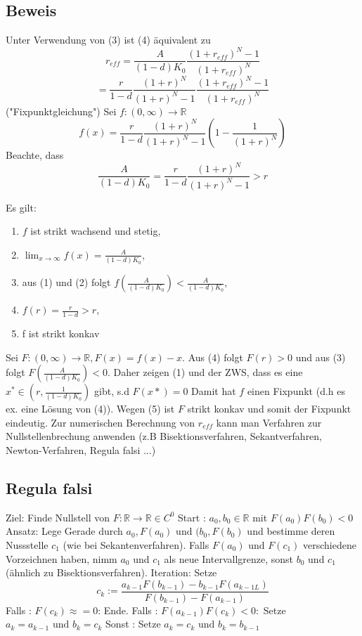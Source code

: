 \documentclass[11pt,a4paper]{article}
\theoremstyle{definition}
\theoremstyle{remark}
\begin{document}
\subsection*{Beweis}
Unter Verwendung von (3) ist (4) äquivalent zu
$$ r_{eff} = \frac{A}{(1-d)K_0} \frac{ \left( 1 + r_{eff} \right)^{N} -1 }{ \left( 1 + r_{eff} \right)^{N}}  $$
$$=  \frac{r}{1-d} \frac{(1+r)^{N}}{  \left( 1 + r \right)^{N} -1 } \frac{ \left( 1 + r_{eff} \right)^{N} -1 }{ \left( 1 + r_{eff} \right)^{N} }  $$
("Fixpunktgleichung")\break
Sei $ f: (0, \infty) \to \mathbb{R} $ 
$$ f(x) = \frac{r}{1-d} \frac{\left( 1 + r \right) ^{N}}{\left( 1 + r \right) ^{N} -1} \left( 1 - \frac{1}{\left( 1 + r \right) ^{N}}  \right)   $$
Beachte, dass
$$ \frac{A}{(1-d)K_0} = \frac{r}{1-d} \frac{\left( 1 + r \right) ^{N}}{\left( 1 + r \right) ^{N} -1 } > r $$

Es gilt: 
\begin{enumerate}[]
	\item $ f $ ist strikt wachsend und stetig,
	\item $ \lim_{ x \to \infty} f (x) = \frac{A}{(1-d) K_0}  $,
	\item aus (1) und (2) folgt $ f \left( \frac{A}{(1-d)K_0}  \right) < \frac{A}{(1-d)K_0}  $,
	\item $ f(r) = \frac{r}{1-d} > r $,
	\item f ist strikt konkav
\end{enumerate}

Sei $ F : (0, \infty) \to \mathbb{R}, F(x) = f(x) -x$. Aus (4) folgt $ F(r) > 0 $ und aus (3) folgt $ F \left( \frac{A}{(1-d) K_0}  \right) < 0 $. Daher zeigen (1) und der ZWS, dass es eine $ x^{*} \in \left(  r,\frac{1}{(1-d)K_0} \right)  $ gibt, s.d $ F(x*) = 0 $ Damit hat $ f $ einen Fixpunkt (d.h es ex. eine Lösung von (4)). Wegen  (5)  ist $ F $ strikt konkav und somit der Fixpunkt eindeutig.
\break
Zur numerischen Berechnung von $ r_{eff} $ kann man Verfahren zur Nullstellenbrechung anwenden (z.B Bisektionsverfahren, Sekantverfahren, Newton-Verfahren, Regula falsi ...)

\subsection*{Regula falsi}
Ziel: Finde Nullstell von $ F: \mathbb{R} \to \mathbb{R} \in C^{0} $ \break
Start : $ a_0, b_0 \in \mathbb{R} $ mit $ F(a_0) F(b_0) < 0 $ \break
Ansatz: Lege Gerade durch $ a_0, F(a_0) \text{ und }  (b_0, F(b_0)  $ und bestimme deren Nussstelle $ c_1 $ (wie bei Sekantenverfahren).
Falls $ F(a_0) \text{ und }  F(c_1) $ verschiedene Vorzeichnen haben, nimm $ a_0 $ und $ c_1 $ als neue Intervallgrenze, sonst $ b_0 $ 
und $ c_1 $ (ähnlich zu Bisektionsverfahren). \break
Iteration: Setze $$ c_{k} := \frac{a_{k-1}F(b_{k-1}) - b_{k-1}F(a_{k-1L})}{F(b_{k-1}) - F(a_{k-1})}  $$
Falls : $ F(c_k) \approx = 0 $: Ende. \break
Falls : $ F \left( a_{k-1} \right) F (c_{k}) < 0 : $ Setze $ a_k = a_{k-1} \text{ und }  b_k = c_k $ \break
Sonst : Setze $ a_k = c_k \text{ und }  b_k = b_{k-1} $ 
\end{document}
